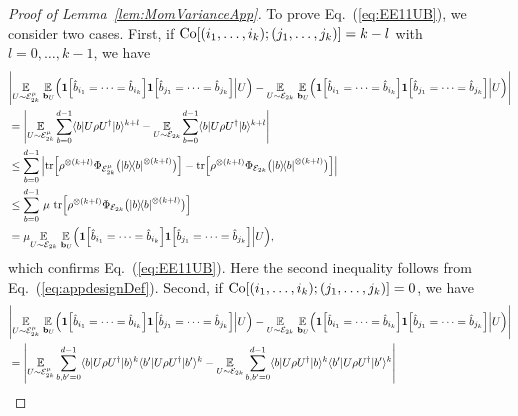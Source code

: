 \documentclass[aps,prl,twocolumn,nofootinbib,superscriptaddress,10pt]{revtex4-2}
\let\originalleft\left
\let\originalright\right
\renewcommand{\left}{\mathopen{}\mathclose\bgroup\originalleft}
\renewcommand{\right}{\aftergroup\egroup\originalright}
\def\E{ {\mathbb E} } %
\def\>{\rangle}
\def\<{\langle}
\newcommand{\ketbra}[2]{\ensuremath{\left|#1\right\rangle\!\left\langle#2\right|}}
\DeclareMathOperator{\Tr}{tr}
\theoremstyle{plain}
\theoremstyle{definition}
\newcommand{\eref}[1]{Eq.~\textup{(\ref{#1})}}
\newcommand{\lref}[1]{Lemma~\ref{#1}}
\begin{document}
\begin{proof}[Proof of \lref{lem:MomVarianceApp}]
To prove \eref{eq:EE11UB}, we consider two cases. First,  if 
${\rm Co}[(i_1,\dots,i_k);(j_1,\dots,j_k)]=k-l$ with $l=0,\dots,k-1$, we have 
\begin{align}
&\left| 
\underset{U\sim \mathcal E_{2k}^\mu}{\E} \, \underset{\,\mathbf{b}_{U}}{\E} \Big(
\textbf{1}\left[\hat{b}_{i_1}=\dots=\hat{b}_{i_k}\right]  
\textbf{1}\left[\hat{b}_{j_1}=\dots=\hat{b}_{j_k}\right]  \Big| U \Big) 
-
\underset{U\sim \mathcal E_{2k}}{\E} \, \underset{\,\mathbf{b}_{U}}{\E} \Big(
\textbf{1}\left[\hat{b}_{i_1}=\dots=\hat{b}_{i_k}\right]  
\textbf{1}\left[\hat{b}_{j_1}=\dots=\hat{b}_{j_k}\right]  \Big| U \Big) 
\right| 
\nonumber\\&= 
\left| 
 \underset{U\sim \mathcal E_{2k}^\mu}{\E}  \sum_{b=0}^{d-1} \<b|U\rho U^{\dag}|b\>^{k+l}
-\underset{U\sim \mathcal E_{2k}}{\E}  \sum_{b=0}^{d-1} \<b|U\rho U^{\dag}|b\>^{k+l}
\right| 
\nonumber\\&\leq 
\sum_{b=0}^{d-1}\, \left| 
  \Tr \left[ \rho^{\otimes (k+l)}  \Phi_{\mathcal E_{2k}^\mu} \big( \ketbra{b}{b}^{\otimes (k+l)} \big) \right] 
- \Tr \left[ \rho^{\otimes (k+l)}  \Phi_{\mathcal E_{2k}} \big( \ketbra{b}{b}^{\otimes (k+l)} \big) \right] 
\right| 
\nonumber\\
&\leq  
\sum_{b=0}^{d-1}\, \mu\,
\Tr \left[ \rho^{\otimes (k+l)}  \Phi_{\mathcal E_{2k}} \big( \ketbra{b}{b}^{\otimes (k+l)} \big) \right] 
\nonumber\\
&= 
\mu \underset{U\sim \mathcal E_{2k}}{\E} \, \underset{\,\mathbf{b}_{U}}{\E} \Big(
\textbf{1}\left[\hat{b}_{i_1}=\dots=\hat{b}_{i_k}\right]  
\textbf{1}\left[\hat{b}_{j_1}=\dots=\hat{b}_{j_k}\right]  \Big| U \Big), 
\end{align}
which confirms \eref{eq:EE11UB}.
Here the second inequality follows from \eref{eq:appdesignDef}. 
Second, if ${\rm Co}[(i_1,\dots,i_k);(j_1,\dots,j_k)]=0$, we have 
\begin{align}
&\left| 
\underset{U\sim \mathcal E_{2k}^\mu}{\E} \, \underset{\,\mathbf{b}_{U}}{\E} \Big(
\textbf{1}\left[\hat{b}_{i_1}=\dots=\hat{b}_{i_k}\right]  
\textbf{1}\left[\hat{b}_{j_1}=\dots=\hat{b}_{j_k}\right]  \Big| U \Big) 
-
\underset{U\sim \mathcal E_{2k}}{\E} \, \underset{\,\mathbf{b}_{U}}{\E} \Big(
\textbf{1}\left[\hat{b}_{i_1}=\dots=\hat{b}_{i_k}\right]  
\textbf{1}\left[\hat{b}_{j_1}=\dots=\hat{b}_{j_k}\right]  \Big| U \Big) 
\right| 
\nonumber\\&= 
\left| 
 \underset{U\sim \mathcal E_{2k}^\mu}{\E}  \sum_{b,b'=0}^{d-1} \<b|U\rho U^{\dag}|b\>^{k} \<b'|U\rho U^{\dag}|b'\>^{k}
-\underset{U\sim \mathcal E_{2k}}{\E}  \sum_{b,b'=0}^{d-1} \<b|U\rho U^{\dag}|b\>^{k} \<b'|U\rho U^{\dag}|b'\>^{k} \right| 

\end{align}
\end{proof}
\end{document}
